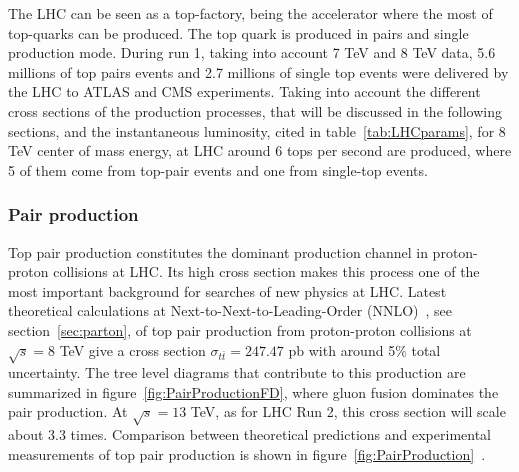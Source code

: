 The LHC can be seen as a top-factory, being the accelerator where the most of top-quarks can be produced. The top quark is produced in pairs and single production mode. During run 1, taking into account 7 TeV and 8 TeV data, 5.6 millions of top pairs events and 2.7 millions of single top events were delivered by the LHC to ATLAS and CMS experiments. Taking into account the different cross sections of the production processes, that will be discussed in the following sections, and the instantaneous luminosity, cited in table~\ref{tab:LHCparams}, for 8 TeV center of mass energy, at LHC around 6 tops per second are produced, where 5 of them come from top-pair events and one from single-top events.  

\subsubsection{Pair production}
\label{subsec:toppair}

Top pair production constitutes the dominant production channel in proton-proton collisions at LHC. Its high cross section makes this process one of the most important background for searches of new physics at LHC. Latest theoretical calculations at Next-to-Next-to-Leading-Order (NNLO)~\cite{Czakon:2013goa}, see section~\ref{sec:parton}, of top pair production from proton-proton collisions at $\sqrt{s}=8$ TeV give a cross section $\sigma_{t\bar{t}}=247.47$ pb with around 5\% total uncertainty. The tree level diagrams that contribute to this production are summarized in figure~\ref{fig:PairProductionFD}, where gluon fusion dominates the pair production. At $\sqrt{s}=13$ TeV, as for LHC Run 2, this cross section will scale about 3.3 times. Comparison between theoretical predictions and experimental measurements of top pair production is shown in figure~\ref{fig:PairProduction}~\cite{TOPLHCWG}.

